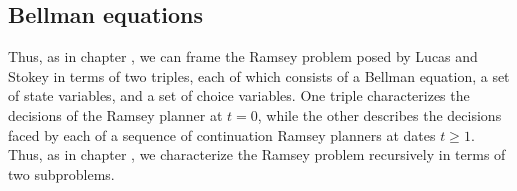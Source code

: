 \subsection{Bellman equations}
Thus, as in chapter , we can frame the Ramsey problem posed by Lucas and Stokey in terms of two triples, each of which consists of a Bellman equation, a set of state variables, and a set of choice variables. One triple characterizes the decisions of the Ramsey planner at  $t=0$, while the other  describes the decisions faced by each of a sequence of continuation Ramsey planners at dates $t \geq 1$.
Thus, as in chapter , we characterize the Ramsey problem recursively in terms of two subproblems.
%
%
%

